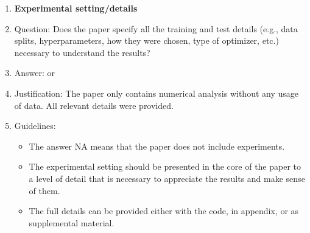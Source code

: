 \documentclass{article}
\theoremstyle{plain}
\theoremstyle{definition}
\begin{document}
\begin{enumerate}
\item {\bf Experimental setting/details}
    \item[] Question: Does the paper specify all the training and test details (e.g., data splits, hyperparameters, how they were chosen, type of optimizer, etc.) necessary to understand the results?
    \item[] Answer: or \answerNA{}
    \item[] Justification: The paper only contains numerical analysis without any usage of data. All relevant details were provided.
    \item[] Guidelines:
    \begin{itemize}
        \item The answer NA means that the paper does not include experiments.
        \item The experimental setting should be presented in the core of the paper to a level of detail that is necessary to appreciate the results and make sense of them.
        \item The full details can be provided either with the code, in appendix, or as supplemental material.
    \end{itemize}


\end{enumerate}
\end{document}
